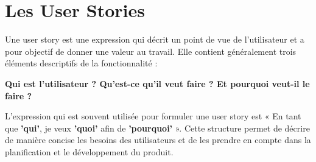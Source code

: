 



\section{Les User Stories}
Une user story est une expression qui décrit un point de vue de l'utilisateur et a pour objectif de donner une valeur au travail. Elle contient généralement trois éléments descriptifs de la fonctionnalité : 

  \textbf{Qui est l'utilisateur ? Qu'est-ce qu'il veut faire ? Et pourquoi veut-il le faire ?}

L'expression qui est souvent utilisée pour formuler une user story est « En tant que \textbf{'qui'}, je veux \textbf{'quoi'} afin de \textbf{'pourquoi'} ». Cette structure permet de décrire de manière concise les besoins des utilisateurs et de les prendre en compte dans la planification et le développement du produit.



